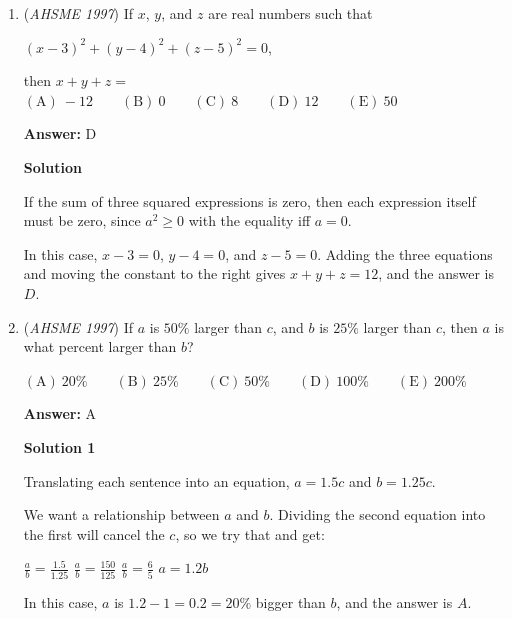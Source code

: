 \begin{enumerate}
\textbf{Solution}

The three unlabelled vertical sides have the same sum as the two labelled vertical sides, which is $10$.

 The four unlabelled horizontal sides have the same sum as the one large horizontal side, which is $12$.

 Thus, the perimeter is $2(12+10) = 44$, which is option $\boxed{D}$.

 


	\item (\textit{AHSME 1997}) If $x$, $y$, and $z$ are real numbers such that


 $(x-3)^2 + (y-4)^2 + (z-5)^2 = 0$,

 then $x + y + z =$
$\mathrm{(A)\ } -12 \qquad \mathrm{(B) \ }0 \qquad \mathrm{(C) \  } 8 \qquad \mathrm{(D) \  } 12 \qquad \mathrm{(E) \  }50$

 \textbf{Answer: }D



\textbf{Solution}

If the sum of three squared expressions is zero, then each expression itself must be zero, since $a^2 \ge 0$ with the equality iff $a=0$.

 In this case, $x-3=0$, $y-4=0$, and $z-5=0$.  Adding the three equations and moving the constant to the right gives $x + y + z = 12$, and the answer is $\boxed{D}$.

 


	\item (\textit{AHSME 1997}) If $a$ is $50\%$ larger than $c$, and $b$ is $25\%$ larger than $c$, then $a$ is what percent larger than $b$?


 $\mathrm{(A)\ } 20\% \qquad \mathrm{(B) \ }25\% \qquad \mathrm{(C) \  } 50\% \qquad \mathrm{(D) \  } 100\% \qquad \mathrm{(E) \  }200\%$

 \textbf{Answer: }A



\textbf{Solution 1}

Translating each sentence into an equation, $a = 1.5c$ and $b = 1.25c$.

 We want a relationship between $a$ and $b$.  Dividing the second equation into the first will cancel the $c$, so we try that and get:

 $\frac{a}{b} = \frac{1.5}{1.25}$
$\frac{a}{b} = \frac{150}{125}$
$\frac{a}{b} = \frac{6}{5}$
$a = 1.2b$

 In this case, $a$ is $1.2 - 1 = 0.2 = 20\%$ bigger than $b$, and the answer is $\boxed{A}$.


\end{enumerate}
